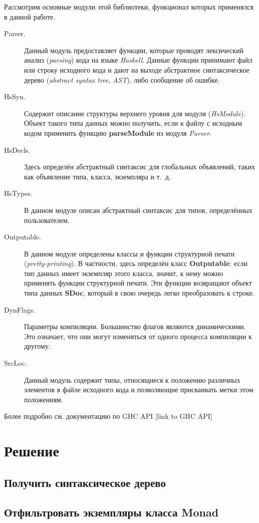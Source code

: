 Рассмотрим основные модули этой библиотеки, функционал которых применялся в данной работе.
\begin{description}
\item[Parser.] Данный модуль предоставляет функции, которые проводят лексический анализ (\textit{parsing}) кода на языке \textit{Haskell}. Данные функции принимают файл или строку исходного кода и дают на выходе абстрактное синтаксическое дерево (\textit{abstract syntax tree}, \textit{AST}), либо сообщение об ошибке.
\item[HsSyn.] Содержит описание структуры верхнего уровня для модуля (\textit{HsModule}). Объект такого типа данных можно получить, если к файлу с исходным кодом применить функцию \textbf{parseModule} из модуля \textit{Parser}.
\item[HsDecls.] Здесь определён абстрактный синтаксис для глобальных объявлений, таких как объявление типа, класса, экземпляра и т.~д.
\item[HsTypes.] В данном модуле описан абстрактный синтаксис для типов, определённых пользователем.
\item[Outputable.] В данном модуле определены классы и функции структурной печати (\textit{pretty-printing}). В частности, здесь определён класс \textbf{Outputable}: если тип данных имеет экземпляр этого класса, значит, к нему можно применять функции структурной печати. Эти функции возвращают объект типа данных \textbf{SDoc}, который в свою очередь легко преобразовать к строке.
\item[DynFlags.] Параметры компиляции. Большинство флагов являются динамическими. Это означает, что они могут изменяться от одного процесса компиляции к другому.
\item[SrcLoc.] Данный модуль содержит типы, относящиеся к положению различных элементов в файле исходного кода и позволяющие присваивать метки этом положениям. 
\end{description}

Более подробно см. документацию по GHC API [link to GHC API]

\newpage
\section{Решение}
\subsection{Получить синтаксическое дерево}
\subsection{Отфильтровать экземпляры класса Monad}
